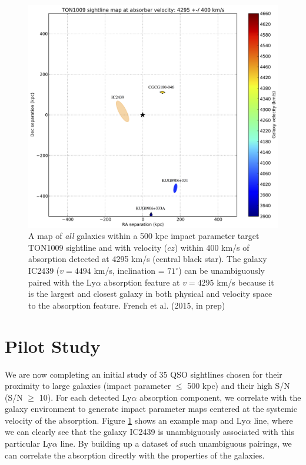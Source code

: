 \documentclass[iop]{emulateapj-rtx4}
\begin{document}
\begin{figure}[h!]
  \centering
  \includegraphics[width=1.\linewidth]{map2_TON1009_4295_newlabels_crop_hires2.png}
  \caption{A map of \textit{all} galaxies within a 500 kpc impact parameter target TON1009 sightline and with velocity ($cz$) within 400 km/s of absorption detected at 4295 km/s (central black star). The galaxy IC2439 ($v=4494$ km/s, inclination = $71^{\circ}$) can be unambiguously paired with the Ly$\alpha$ absorption feature at $v=4295$ km/s because it is the largest and closest galaxy in both physical and velocity space to the absorption feature. French et al. (2015, in prep)}
  \label{impactmap}
\label{TON1009}
\vspace{5pt}
\end{figure}




\section{Pilot Study}

\indent We are now completing an initial study of 35 QSO sightlines chosen for their proximity to large galaxies (impact parameter $\leq$ 500 kpc) and their high S/N (S/N $\ge$ 10). For each detected Ly$\alpha$ absorption component, we correlate with the galaxy environment to generate impact parameter maps centered at the systemic velocity of the absorption. Figure \ref{TON1009} shows an example map and Ly$\alpha$ line, where we can clearly see that the galaxy IC2439 is unambiguously associated with this particular Ly$\alpha$ line. By building up a dataset of such unambiguous pairings, we can correlate the absorption directly with the properties of the galaxies.
\end{document}
